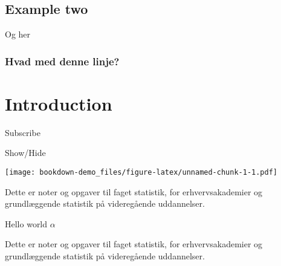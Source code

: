 \documentclass[]{book}
\newenvironment{Shaded}{\begin{snugshade}}{\end{snugshade}}
\newcommand{\KeywordTok}[1]{\textcolor[rgb]{0.13,0.29,0.53}{\textbf{#1}}}
\newcommand{\NormalTok}[1]{#1}
\newcommand{\OperatorTok}[1]{\textcolor[rgb]{0.81,0.36,0.00}{\textbf{#1}}}
\theoremstyle{definition}
\theoremstyle{definition}
\theoremstyle{definition}
\theoremstyle{remark}
\begin{document}
\hypertarget{example-two-1}{%
\section{Example two}\label{example-two-1}}

Og her

\hypertarget{hvad-med-denne-linje}{%
\subsection{Hvad med denne linje?}\label{hvad-med-denne-linje}}

\hypertarget{intro}{%
\chapter{Introduction}\label{intro}}

Subscribe

Show/Hide

\hypertarget{BlockName}{}
\begin{Shaded}
\end{Shaded}

\texttt{[image: bookdown-demo\_files/figure-latex/unnamed-chunk-1-1.pdf]}

Dette er noter og opgaver til faget statistik, for erhvervsakademier og
grundlæggende statistik på videregående uddannelser.

\leavevmode\hypertarget{BlockName3}{}%
Hello world \(\alpha\)

Dette er noter og opgaver til faget statistik, for erhvervsakademier og
grundlæggende statistik på videregående uddannelser.
\end{document}
